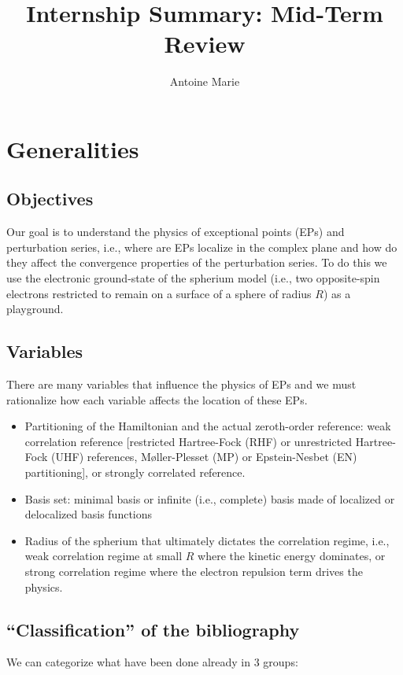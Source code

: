 \documentclass{article}
\title{Internship Summary: Mid-Term Review}
\author{Antoine Marie}
\begin{document}
\maketitle

\section{Generalities}

\subsection{Objectives}
Our goal is to understand the physics of exceptional points (EPs) and perturbation series, i.e., where are EPs localize in the complex plane and how do they affect the convergence properties of the perturbation series. To do this we use the electronic ground-state of the spherium model (i.e., two opposite-spin electrons restricted to remain on a surface of a sphere of radius $R$) as a playground. 

\subsection{Variables}

There are many variables that influence the physics of EPs and we must rationalize how each variable affects the location of these EPs.
\begin{itemize}
	\item Partitioning of the Hamiltonian and the actual zeroth-order reference: weak correlation reference [restricted Hartree-Fock (RHF) or unrestricted Hartree-Fock (UHF) references, M{\o}ller-Plesset (MP) or Epstein-Nesbet (EN) partitioning], or strongly correlated reference.
	\item Basis set: minimal basis or infinite (i.e., complete) basis made of localized or delocalized basis functions
	\item Radius of the spherium that ultimately dictates the correlation regime, i.e., weak correlation regime at small $R$ where the kinetic energy dominates, or strong correlation regime where the electron repulsion term drives the physics.
\end{itemize}

\subsection{``Classification'' of the bibliography}

We can categorize what have been done already in 3 groups:
\end{document}

